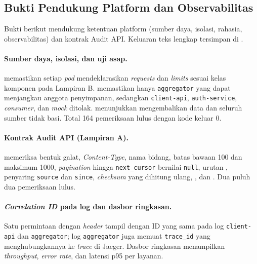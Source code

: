 \subsection{Bukti Pendukung Platform dan Observabilitas}

Bukti berikut mendukung ketentuan platform (sumber daya, isolasi, rahasia, observabilitas) dan kontrak Audit API. Keluaran teks lengkap tersimpan di .

\paragraph*{Sumber daya, isolasi, dan uji asap.}
 memastikan setiap \textit{pod} mendeklarasikan \textit{requests} dan \textit{limits} sesuai kelas komponen pada Lampiran B.  memastikan hanya \texttt{aggregator} yang dapat menjangkau anggota penyimpanan, sedangkan \texttt{client-api}, \texttt{auth-service}, \textit{consumer}, dan \textit{mock} ditolak.  menunjukkan  mengembalikan data dan seluruh sumber tidak basi. Total 164 pemeriksaan lulus dengan kode keluar 0.

\paragraph*{Kontrak Audit API (Lampiran A).}
 memeriksa bentuk galat, \textit{Content-Type}, nama bidang, batas bawaan 100 dan maksimum 1000, \textit{pagination} hingga \texttt{next\_cursor} bernilai \texttt{null}, urutan , penyaring \texttt{source} dan \texttt{since}, \textit{checksum} yang dihitung ulang, , dan . Dua puluh dua pemeriksaan lulus.

\paragraph*{\textit{Correlation ID} pada log dan dasbor ringkasan.}
Satu permintaan  dengan \textit{header}  tampil dengan ID yang sama pada log \texttt{client-api} dan \texttt{aggregator}; log \texttt{aggregator} juga memuat \texttt{trace\_id} yang menghubungkannya ke \textit{trace} di Jaeger. Dasbor ringkasan menampilkan \textit{throughput}, \textit{error rate}, dan latensi p95 per layanan.
